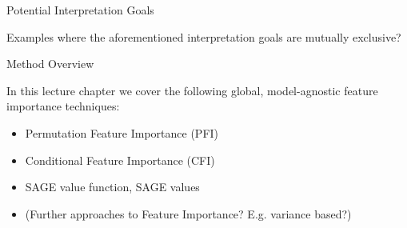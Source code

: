 \documentclass[11pt,compress,t,notes=noshow, xcolor=table]{beamer}
\begin{document}
\begin{vbframe}{Potential Interpretation Goals}

Examples where the aforementioned interpretation goals are mutually exclusive?

\end{vbframe}

\begin{vbframe}{Method Overview}

In this lecture chapter we cover the following global, model-agnostic feature importance techniques:

\begin{itemize}
  \item Permutation Feature Importance (PFI)
  \item Conditional Feature Importance (CFI)
  \item SAGE value function, SAGE values
  \item (Further approaches to Feature Importance? E.g. variance based?)
\end{itemize}

\end{vbframe}

\endlecture
\end{document}

